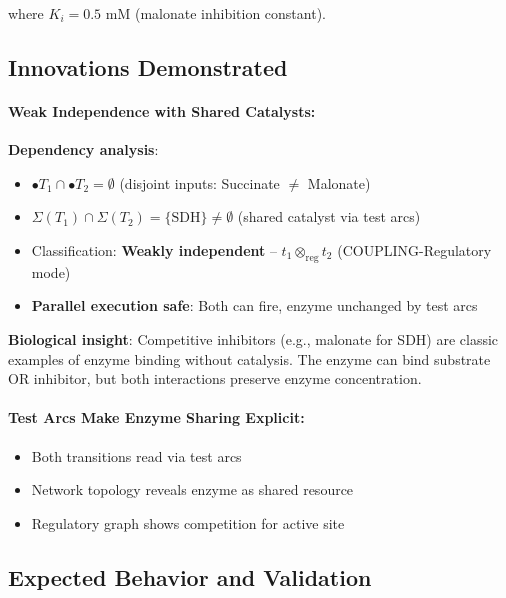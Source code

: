 where $K_i = 0.5$ mM (malonate inhibition constant).

\subsection{Innovations Demonstrated}
\label{subsec:comp-innovations}

\paragraph{Weak Independence with Shared Catalysts:}

\textbf{Dependency analysis}:
\begin{itemize}
    \item $\bullet T_1 \cap \bullet T_2 = \emptyset$ (disjoint inputs: Succinate $\neq$ Malonate)
    \item $\Sigma(T_1) \cap \Sigma(T_2) = \{\text{SDH}\} \neq \emptyset$ (shared catalyst via test arcs)
    \item Classification: \textbf{Weakly independent} -- $t_1 \otimes_{\text{reg}} t_2$ (COUPLING-Regulatory mode)
    \item \textbf{Parallel execution safe}: Both can fire, enzyme unchanged by test arcs
\end{itemize}

\textbf{Biological insight}: Competitive inhibitors (e.g., malonate for SDH) are classic examples of enzyme binding without catalysis. The enzyme can bind substrate OR inhibitor, but both interactions preserve enzyme concentration.

\paragraph{Test Arcs Make Enzyme Sharing Explicit:}

\begin{itemize}
    \item Both transitions read  via test arcs
    \item Network topology reveals enzyme as shared resource
    \item Regulatory graph shows competition for active site
\end{itemize}

\subsection{Expected Behavior and Validation}
\label{subsec:comp-validation}

